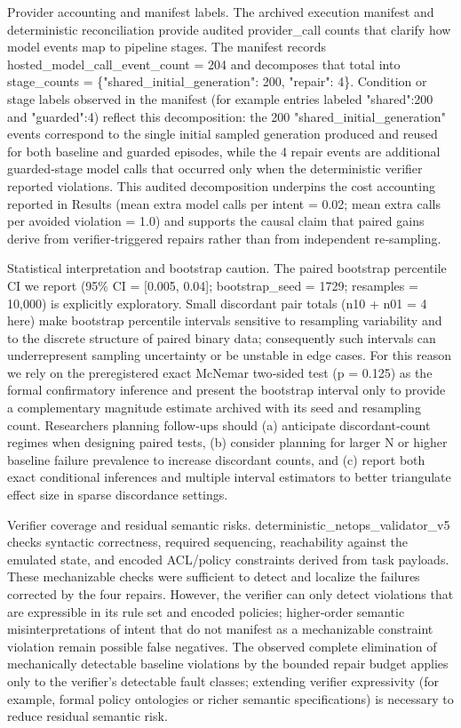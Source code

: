 \documentclass[conference]{IEEEtran}
\begin{document}
Provider accounting and manifest labels. The archived execution manifest and deterministic reconciliation provide audited provider\_call counts that clarify how model events map to pipeline stages. The manifest records hosted\_model\_call\_event\_count = 204 and decomposes that total into stage\_counts = \{"shared\_initial\_generation": 200, "repair": 4\}. Condition or stage labels observed in the manifest (for example entries labeled "shared":200 and "guarded":4) reflect this decomposition: the 200 "shared\_initial\_generation" events correspond to the single initial sampled generation produced and reused for both baseline and guarded episodes, while the 4 repair events are additional guarded‑stage model calls that occurred only when the deterministic verifier reported violations. This audited decomposition underpins the cost accounting reported in Results (mean extra model calls per intent = 0.02; mean extra calls per avoided violation = 1.0) and supports the causal claim that paired gains derive from verifier‑triggered repairs rather than from independent re‑sampling.

Statistical interpretation and bootstrap caution. The paired bootstrap percentile CI we report (95\% CI = [0.005, 0.04]; bootstrap\_seed = 1729; resamples = 10,000) is explicitly exploratory. Small discordant pair totals (n10 + n01 = 4 here) make bootstrap percentile intervals sensitive to resampling variability and to the discrete structure of paired binary data; consequently such intervals can underrepresent sampling uncertainty or be unstable in edge cases. For this reason we rely on the preregistered exact McNemar two‑sided test (p = 0.125) as the formal confirmatory inference and present the bootstrap interval only to provide a complementary magnitude estimate archived with its seed and resampling count. Researchers planning follow‑ups should (a) anticipate discordant‑count regimes when designing paired tests, (b) consider planning for larger N or higher baseline failure prevalence to increase discordant counts, and (c) report both exact conditional inferences and multiple interval estimators to better triangulate effect size in sparse discordance settings.

Verifier coverage and residual semantic risks. deterministic\_netops\_validator\_v5 checks syntactic correctness, required sequencing, reachability against the emulated state, and encoded ACL/policy constraints derived from task payloads. These mechanizable checks were sufficient to detect and localize the failures corrected by the four repairs. However, the verifier can only detect violations that are expressible in its rule set and encoded policies; higher‑order semantic misinterpretations of intent that do not manifest as a mechanizable constraint violation remain possible false negatives. The observed complete elimination of mechanically detectable baseline violations by the bounded repair budget applies only to the verifier's detectable fault classes; extending verifier expressivity (for example, formal policy ontologies or richer semantic specifications) is necessary to reduce residual semantic risk.
\end{document}
